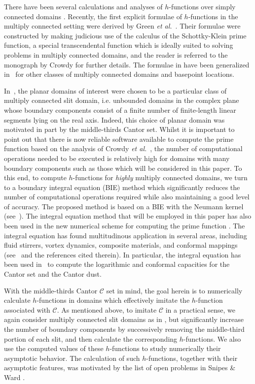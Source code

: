 There have been several calculations and analyses of $h$-functions over simply connected domains \cite{SnipWard16}. Recently, the first explicit formulae of $h$-functions in the multiply connected setting were derived by Green \textit{et al.}~\cite{gswc}. Their formulae were constructed by making judicious use of the calculus of the Schottky-Klein prime function, a special transcendental function which is ideally suited to solving problems in multiply connected domains, and the reader is referred to the monograph by Crowdy \cite{CrowdyBook} for further details.
The formulae in \cite{gswc} have been generalized in~\cite{ArMa} for other classes of multiply connected domains and basepoint locations.

In~\cite{gswc}, the planar domains of interest were chosen to be a particular class of multiply connected slit domain, i.e. unbounded domains in the complex plane whose boundary components consist of a finite number of finite-length linear segments lying on the real axis. Indeed, this choice of planar domain was motivated in part by the middle-thirds Cantor set. 
Whilst it is important to point out that there is now reliable software available to compute the prime function  based on the analysis of Crowdy \textit{et al.}~\cite{ckgn}, the number of computational operations needed to be executed is relatively high for domains with many boundary components such as those which will be considered in this paper. To this end, to compute $h$-functions for \textit{highly} multiply connected domains, we turn to a boundary integral equation (BIE) method which significantly reduces the number of computational operations required while also maintaining a good level of accuracy. 
The proposed method is based on a BIE with the Neumann kernel (see~\cite{Weg-Nas,Nas-ETNA}). 
The integral equation method that will be employed in this paper has also been used in the new numerical scheme for computing the prime function \cite{ckgn}. The integral equation has found multitudinous application in several areas, including fluid stirrers, vortex dynamics, composite materials, and conformal mappings (see~\cite{Nas-ETNA,NG18,NK} and the references cited therein).
In particular, the integral equation has been used in~\cite{LSN17,Nvm} to compute the logarithmic and conformal capacities for the Cantor set and the Cantor dust.

With the middle-thirds Cantor $\mathcal{C}$ set in mind, the goal herein is to numerically calculate $h$-functions in domains which effectively imitate the $h$-function associated with $\mathcal{C}$.
As mentioned above, to imitate $\mathcal{C}$ in a practical sense, we again consider multiply connected slit domains as in \cite{gswc}, but significantly increase the number of boundary components by successively removing the middle-third portion of each slit, and then calculate the corresponding $h$-functions.
We also use the computed values of these $h$-functions to study numerically their asymptotic behavior.
The calculation of such $h$-functions, together with their asymptotic features, was motivated by the list of open problems in Snipes \& Ward \cite{SnipWard16}. 

